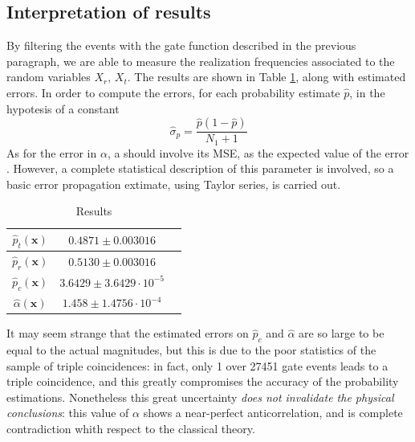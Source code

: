\documentclass[10pt, final]{article}
\begin{document}
\begin{multicols}{2}
\subsection*{Interpretation of results}
By filtering the events with the gate function described in the previous paragraph, we are able to measure the realization frequencies associated to the random variables $X_r, \, X_t$. The results are shown in Table \ref{result}, along with estimated errors.
In order to compute the errors, for each probability estimate $\hat{p}$, in the hypotesis of a constant 
\begin{equation}
    \hat{\sigma}_{p} = \frac{\hat{p}(1-\hat{p})}{N_1+1}
\end{equation}
As for the error in $\alpha$, a  should involve its MSE, as the expected value of the error . However, a complete statistical description of this parameter is involved, so a basic error propagation extimate, using Taylor series, is carried out. 
\renewcommand{\arraystretch}{1.5}
\begin{mdframed}
    \begin{table}[H]
        \centering
        \begin{tabular}{|c|c|c|}
            \hline
            $\hat{p}_t (\mathbf{x})$ & $0.4871 \pm 0.003016$\\
            \hline
            $\hat{p}_r (\mathbf{x})$ & $0.5130 \pm 0.003016$\\
            \hline
            $\hat{p}_c (\mathbf{x})$ & $3.6429 \pm 3.6429 \cdot 10^{-5}$\\
            \hline
            $\hat{\alpha} (\mathbf{x})$ & $1.458  \pm 1.4756 \cdot 10^{-4}$\\
            \hline
        \end{tabular}
        \caption{Results}
        \label{result}
    \end{table}
\end{mdframed}
It may seem strange that the estimated errors on $\hat{p}_c$ and $\hat{\alpha}$ are so large to be equal to the actual magnitudes, but this is due to the poor statistics of the sample of triple coincidences: in fact, only 1 over 27451 gate events leads to a triple coincidence, and this greatly compromises the accuracy of the probability estimations. Nonetheless this great uncertainty \emph{does not invalidate the physical conclusions}: this value of $\alpha$ shows a near-perfect anticorrelation, and is complete contradiction whith respect to the classical theory. 


\end{multicols}
\end{document}

